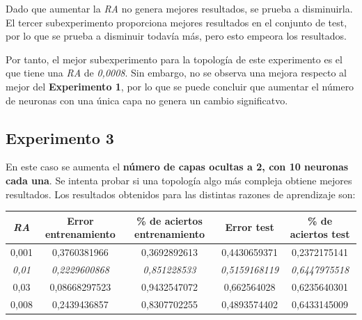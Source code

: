 \documentclass{uc3mpracticas}
\begin{document}
\vspace{2mm}

Dado que aumentar la \textit{RA} no genera mejores resultados, se prueba a disminuirla. El tercer subexperimento proporciona mejores resultados en el conjunto de test, por lo que se prueba a disminuir todavía más, pero esto empeora los resultados.

\vspace{1mm}

Por tanto, el mejor subexperimento para la topología de este experimento es el que tiene una \textit{RA} de \textit{0,0008}. Sin embargo, no se observa una mejora respecto al mejor del \textbf{Experimento 1}, por lo que se puede concluir que aumentar el número de neuronas con una única capa no genera un cambio significatvo.


\subsection{Experimento 3}

En este caso se aumenta el \textbf{número de capas ocultas a 2, con 10 neuronas cada una}. Se intenta probar si una topología algo más compleja obtiene mejores resultados. Los resultados obtenidos para las distintas razones de aprendizaje son:

\begin{center}
  \begin{tabular}{|c|c|c|c|c|}
    \hline
        \textit{\textbf{RA}}  & \textbf{Error entrenamiento} & \textbf{\% de aciertos entrenamiento} & \textbf{Error test} & \textbf{\% de aciertos test}\\ \hline
        0,001                 &  0,3760381966                &  0,3692892613                         &  0,4430659371       &  0,2372175141               \\ \hline
        \textit{0,01}         &  \textit{0,2229600868}       &  \textit{0,851228533}                 &  \textit{0,5159168119}&  \textit{0,6447975518}    \\ \hline
        0,03                  &  0,08668297523               &  0,9432547072                         &  0,662564028        &  0,6235640301               \\ \hline
        0,008                 &  0,2439436857                &  0,8307702255                         &  0,4893574402       &  0,6433145009               \\ \hline

  \end{tabular}
\end{center}
\end{document}
